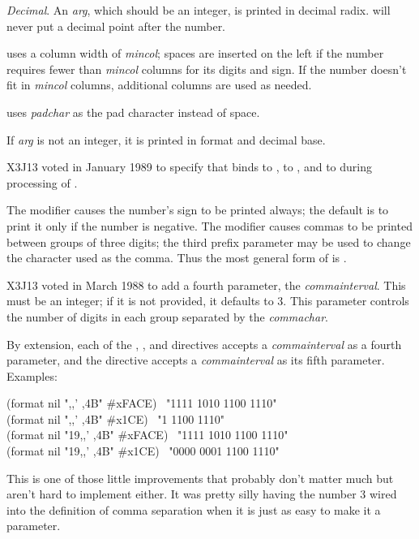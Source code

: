 \begin{flushdesc}
\newpage%

\item[\cd{{\Xtilde}D}]
\emph{Decimal}.
An \emph{arg}, which should be an integer, is printed in decimal radix.
 will never put a decimal point after the number.

 uses a column width of \emph{mincol}; spaces are inserted on
the left if the number requires fewer than \emph{mincol} columns for its digits
and sign.  If the number doesn't fit in \emph{mincol} columns, additional columns
are used as needed.

 uses \emph{padchar} as the pad character
instead of space.

If \emph{arg} is not an integer, it is printed
in  format and decimal base.

\begin{new}
X3J13 voted in January 1989
to specify that  binds 
to ,  to , and  to 
during processing of .
\end{new}

The \cd{{\Xatsign}} modifier causes the number's sign to be printed always; the default
is to print it only if the number is negative.
The \cd{:} modifier causes commas to be printed between groups of three digits;
the third prefix parameter may be used to change the character used as the comma.
Thus the most general form of  is
.

\begin{new}
X3J13 voted in March 1988
to add a fourth parameter, the \emph{commainterval}.
This must be an integer; if it is not provided,
it defaults to 3.  This parameter controls the number of digits in each
group separated by the \emph{commachar}.

By extension, each of the , , and  directives
accepts a \emph{commainterval} as a fourth parameter,
and the  directive accepts a \emph{commainterval} as its fifth parameter.
Examples:
\begin{lisp}
(format nil "{\Xtilde},,' ,4B" \#xFACE) \EV\ "1111 1010 1100 1110" \\
(format nil "{\Xtilde},,' ,4B" \#x1CE) \EV\ "1 1100 1110" \\
(format nil "{\Xtilde}19,,' ,4B" \#xFACE) \EV\ "1111 1010 1100 1110" \\
(format nil "{\Xtilde}19,,' ,4B" \#x1CE) \EV\ "0000 0001 1100 1110"
\end{lisp}
This is one of those little improvements that probably don't matter much
but aren't hard to implement either.  It was pretty silly having the number 3 wired
into the definition of comma separation when it is just as easy to make it
a parameter.
\end{new}


\end{flushdesc}
